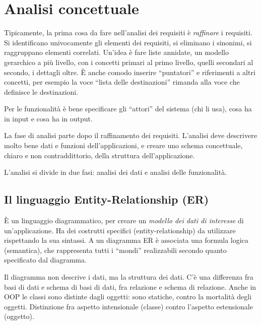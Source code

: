 

\section{Analisi concettuale}

Tipicamente, la prima cosa da fare nell'analisi dei requisiti \`e \emph{raffinare} i requisiti. Si identificano univocamente gli elementi dei requisiti, si eliminano i sinonimi, si raggruppano elementi correlati. Un'idea \`e fare liste annidate, un modello gerarchico a pi\`u livello, con i concetti primari al primo livello, quelli secondari al secondo, i dettagli oltre. \`E anche comodo inserire ``puntatori'' e riferimenti a altri concetti, per esempio la voce ``lista delle destinazioni'' rimanda alla voce che definisce le destinazioni.

Per le funzionalit\`a \`e bene specificare gli ``attori'' del sistema (chi li usa), cosa ha in input e cosa ha in output.

La fase di analisi parte dopo il raffinamento dei requisiti. L'analisi deve descrivere molto bene dati e funzioni dell'applicazioni, e creare uno schema concettuale, chiaro e non contraddittorio, della struttura dell'applicazione.

L'analisi si divide in due fasi: analisi dei dati e analisi delle funzionalit\`a.

\subsection{Il linguaggio Entity-Relationship (ER)}

\`E un linguaggio diagrammatico, per creare un \emph{modello dei dati di interesse} di un'applicazione. Ha dei costrutti specifici (entity-relationship) da utilizzare rispettando la sua sintassi. A un diagramma ER \`e associata una formula logica (semantica), che rappresenta tutti i ``mondi'' realizzabili secondo quanto specificato dal diagramma.

Il diagramma non descrive i dati, ma la struttura dei dati. C'\`e una differenza fra basi di dati e schema di basi di dati, fra relazione e schema di relazione. Anche in OOP le classi sono distinte dagli oggetti: sono statiche, contro la mortalit\`a degli oggetti. Distinzione fra aspetto intensionale (classe) contro l'aspetto estensionale (oggetto).

